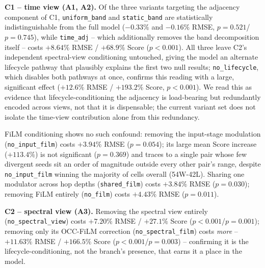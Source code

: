 \textbf{C1 -- time view (A1, A2).} Of the three variants targeting the adjacency component of C1, \texttt{uniform\_band} and \texttt{static\_band} are statistically indistinguishable from the full model ($-0.33\%$ and $-0.16\%$ RMSE, $p=0.521$/$p=0.745$), while \texttt{time\_adj} -- which additionally removes the band decomposition itself -- costs $+8.64\%$ RMSE / $+68.9\%$ Score ($p{<}0.001$). All three leave C2's independent spectral-view conditioning untouched, giving the model an alternate lifecycle pathway that plausibly explains the first two null results; \texttt{no\_lifecycle}, which disables both pathways at once, confirms this reading with a large, significant effect ($+12.6\%$ RMSE / $+193.2\%$ Score, $p{<}0.001$). We read this as evidence that lifecycle-conditioning the adjacency is load-bearing but redundantly encoded across views, not that it is dispensable; the current variant set does not isolate the time-view contribution alone from this redundancy.

FiLM conditioning shows no such confound: removing the input-stage modulation (\texttt{no\_input\_film}) costs $+3.94\%$ RMSE ($p=0.054$); its large mean Score increase ($+113.4\%$) is not significant ($p=0.369$) and traces to a single pair whose few divergent seeds sit an order of magnitude outside every other pair's range, despite \texttt{no\_input\_film} winning the majority of cells overall (54W-42L). Sharing one modulator across hop depths (\texttt{shared\_film}) costs $+3.84\%$ RMSE ($p=0.030$); removing FiLM entirely (\texttt{no\_film}) costs $+4.43\%$ RMSE ($p=0.011$).

\textbf{C2 -- spectral view (A3).} Removing the spectral view entirely (\texttt{no\_spectral\_view}) costs $+7.20\%$ RMSE / $+27.1\%$ Score ($p{<}0.001$/$p=0.001$); removing only its OCC-FiLM correction (\texttt{no\_spectral\_film}) costs \emph{more} -- $+11.63\%$ RMSE / $+166.5\%$ Score ($p{<}0.001$/$p=0.003$) -- confirming it is the lifecycle-conditioning, not the branch's presence, that earns it a place in the model.

